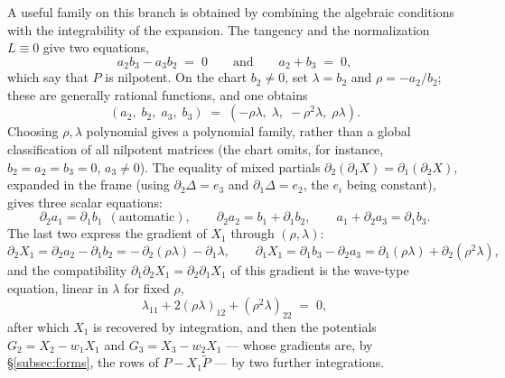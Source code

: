 \documentclass[11pt]{article}
\numberwithin{equation}{section}
\theoremstyle{plain}
\theoremstyle{definition}
\theoremstyle{remark}
\begin{document}
A useful family on this branch is obtained by combining the algebraic
conditions with the integrability of the expansion. The tangency and the normalization
$L\equiv0$ give two equations,
\[
a_2b_3-a_3b_2\;=\;0
\qquad\text{and}\qquad
a_2+b_3\;=\;0 ,
\]
which say that $P$ is nilpotent. On the chart $b_2\ne0$, set
$\lambda=b_2$ and $\rho=-a_2/b_2$; these are generally rational functions,
and one obtains
\[
(a_2,\;b_2,\;a_3,\;b_3)\;=\;(-\rho\lambda,\;\lambda,\;-\rho^2\lambda,\;\rho\lambda).
\]
Choosing $\rho,\lambda$ polynomial gives a polynomial family, rather than
a global classification of all nilpotent matrices (the chart omits,
for instance, $b_2=a_2=b_3=0$, $a_3\ne0$).
The equality of mixed partials $\partial_2(\partial_1X)=\partial_1(\partial_2X)$,
expanded in the frame (using $\partial_2\Delta=e_3$ and $\partial_1\Delta=e_2$,
the $e_i$ being constant), gives three scalar equations:
\[
\partial_2a_1=\partial_1b_1\ \ (\text{automatic}),\qquad
\partial_2a_2=b_1+\partial_1b_2,\qquad
a_1+\partial_2a_3=\partial_1b_3 .
\]
The last two express the gradient of $X_1$ through $(\rho,\lambda)$:
\[
\partial_2X_1=\partial_2a_2-\partial_1b_2=-\,\partial_2(\rho\lambda)-\partial_1\lambda,
\qquad
\partial_1X_1=\partial_1b_3-\partial_2a_3=\partial_1(\rho\lambda)+\partial_2(\rho^2\lambda),
\]
and the compatibility $\partial_1\partial_2X_1=\partial_2\partial_1X_1$ of this
gradient is the wave-type equation, linear in $\lambda$ for fixed $\rho$,
\begin{equation}\label{eq:wave}
\lambda_{11}+2(\rho\lambda)_{12}+(\rho^2\lambda)_{22}\;=\;0 ,
\end{equation}
after which $X_1$ is recovered by integration,
and then the potentials
$G_2=X_2-w_1X_1$ and $G_3=X_3-w_2X_1$ --- whose gradients are, by
\S\ref{subsec:forms}, the rows of $P-X_1\widetilde P$ --- by two further
integrations.
\end{document}
